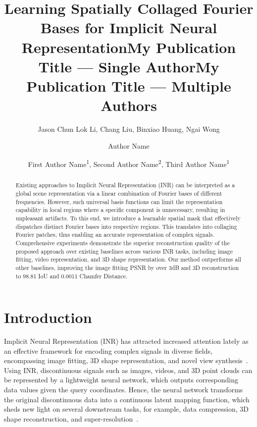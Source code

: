 \documentclass[letterpaper]{article} %
\title{Learning Spatially Collaged Fourier Bases for Implicit Neural Representation}
\author{
    Jason Chun Lok Li\equalcontrib,
    Chang Liu\equalcontrib,
    Binxiao Huang,
    Ngai Wong
}
\title{My Publication Title --- Single Author}
\author {
    Author Name
}
\title{My Publication Title --- Multiple Authors}
\author {
    First Author Name\textsuperscript{\rm 1},
    Second Author Name\textsuperscript{\rm 2},
    Third Author Name\textsuperscript{\rm 1}
}
\begin{document}
\maketitle

\begin{abstract}
Existing approaches to Implicit Neural Representation (INR) can be interpreted as a global scene representation via a linear combination of Fourier bases of different frequencies. However, such universal basis functions can limit the representation capability in local regions where a specific component is unnecessary, resulting in unpleasant artifacts. To this end, we introduce a learnable spatial mask that effectively dispatches distinct Fourier bases into respective regions. This translates into collaging Fourier patches, thus enabling an accurate representation of complex signals. Comprehensive experiments demonstrate the superior reconstruction quality of the proposed approach over existing baselines across various INR tasks, including image fitting, video representation, and 3D shape representation. Our method outperforms all other baselines, improving the image fitting PSNR by over 3dB and 3D reconstruction to 98.81 IoU and 0.0011 Chamfer Distance.
\end{abstract}

\section{Introduction}
\label{sec:introduction}
Implicit Neural Representation (INR) has attracted increased attention lately as an effective framework for encoding complex signals in diverse fields, encompassing image fitting, 3D shape representation, and novel view synthesis~\cite{2020siren, saragadam2023wire, mildenhall2021nerf}. Using INR, discontinuous signals such as images, videos, and 3D point clouds can be represented by a lightweight neural network, which outputs corresponding data values given the query coordinates. Hence, the neural network transforms the original discontinuous data into a continuous latent mapping function, which sheds new light on several downstream tasks, for example, data compression, 3D shape reconstruction, and super-resolution~\cite{2020siren, saragadam2023wire}.
\end{document}
